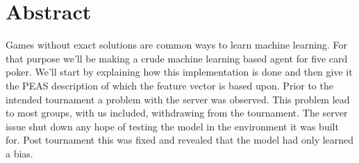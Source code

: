 \documentclass[../main.tex]{subfiles}
\begin{document}
\section*{Abstract}
Games without exact solutions are common ways to learn machine learning. For that purpose we'll be making a crude machine learning based agent for five card poker. We'll start by explaining how this implementation is done and then give it the PEAS description of which the feature vector is based upon. Prior to the intended tournament a problem with the server was observed. This problem lead to most groups, with us included, withdrawing from the tournament. The server issue shut down any hope of testing the model in the environment it was built for. Post tournament this was fixed and revealed that the model had only learned a bias.
\end{document}

